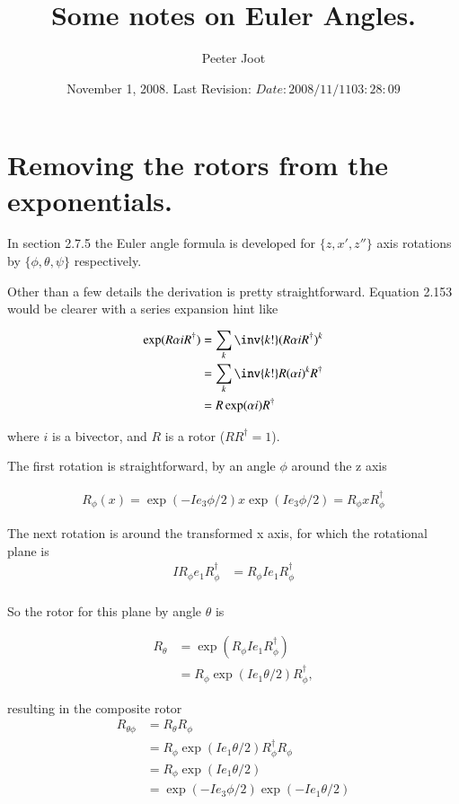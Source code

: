 \documentclass{article}
\title{Some notes on Euler Angles.}
\author{Peeter Joot}
\date{ November 1, 2008. Last Revision: $Date: 2008/11/11 03:28:09 $ }
\begin{document}
\maketitle{}
\tableofcontents

\section{ Removing the rotors from the exponentials. }

In \cite{doran2003gap} section 2.7.5 the Euler angle formula is 
developed for $\{z,x',z''\}$ axis rotations by $\{\phi, \theta, \psi\}$
respectively.

Other than a few details the derivation is pretty straightforward.  Equation
2.153 would be clearer with a series expansion hint like

\begin{align*}
\exp(R \alpha i R^\dagger) 
&= \sum_k \inv{k!} (R \alpha i R^\dagger)^k \\
&= \sum_k \inv{k!} R (\alpha i)^k R^\dagger \\
&= R \exp(\alpha i) R^\dagger
\end{align*}

where $i$ is a bivector, and $R$ is a rotor ($RR^\dagger = 1$).

The first rotation is straightforward, by an angle $\phi$ around the z axis

\begin{align*}
R_\phi(x) = \exp(-Ie_3 \phi/2) x \exp(Ie_3 \phi/2) = R_\phi x R_\phi^\dagger
\end{align*}

The next rotation is around the transformed x axis, for which the rotational plane is
\begin{align*}
I R_\phi e_1 R_\phi^\dagger 
&= R_\phi I e_1 R_\phi^\dagger  \\
\end{align*}

So the rotor for this plane by angle $\theta$ is

\begin{align*}
R_\theta 
&= \exp( R_\phi I e_1 R_\phi^\dagger ) \\
&= R_\phi \exp( I e_1 \theta/2) R_\phi^\dagger,
\end{align*}

resulting in the composite rotor
\begin{align*}
R_{\theta\phi}
&=
R_\theta 
R_\phi \\
&= R_\phi \exp( I e_1 \theta/2) R_\phi^\dagger R_\phi \\
&= R_\phi \exp( I e_1 \theta/2) \\
&= 
\exp{( -I e_3 \phi/2 )}
\exp( -I e_1 \theta/2 ) \\
\end{align*}
\end{document}
